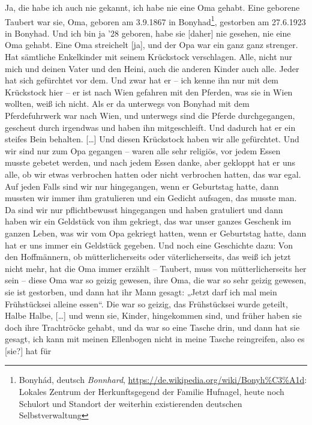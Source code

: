 \documentclass[ngerman,]{article}
\providecommand{\tightlist}{%
  \setlength{\itemsep}{0pt}\setlength{\parskip}{0pt}}
\begin{document}
\begin{multicols}{3}
\begin{description}
\tightlist
\item[Käthe]
Ja, die habe ich auch nie gekannt, ich habe nie eine Oma gehabt. Eine
geborene Taubert war sie, Oma, geboren am 3.9.1867 in Bonyhad\footnote{Bonyhád,
  deutsch \emph{Bonnhard},
  \url{https://de.wikipedia.org/wiki/Bonyh\%C3\%A1d}: Lokales Zentrum
  der Herkunftsgegend der Familie Hufnagel, heute noch Schulort und
  Standort der weiterhin existierenden deutschen Selbstverwaltung},
gestorben am 27.6.1923 in Bonyhad. Und ich bin ja '28 geboren, habe sie
{[}daher{]} nie gesehen, nie eine Oma gehabt. Eine Oma streichelt
{[}ja{]}, und der Opa war ein ganz ganz strenger. Hat sämtliche
Enkelkinder mit seinem Krückstock verschlagen. Alle, nicht nur mich und
deinen Vater und den Heini, auch die anderen Kinder auch alle. Jeder hat
sich gefürchtet vor dem. Und zwar hat er – ich kenne ihn nur mit dem
Krückstock hier – er ist nach Wien gefahren mit den Pferden, was sie in
Wien wollten, weiß ich nicht. Als er da unterwegs von Bonyhad mit dem
Pferdefuhrwerk war nach Wien, und unterwegs sind die Pferde
durchgegangen, gescheut durch irgendwas und haben ihn mitgeschleift. Und
dadurch hat er ein steifes Bein behalten. {[}\ldots{}{]} Und diesen
Krückstock haben wir alle gefürchtet. Und wir sind nur zum Opa gegangen
– waren alle sehr religiös, vor jedem Essen musste gebetet werden, und
nach jedem Essen danke, aber gekloppt hat er uns alle, ob wir etwas
verbrochen hatten oder nicht verbrochen hatten, das war egal. Auf jeden
Falls sind wir nur hingegangen, wenn er Geburtstag hatte, dann mussten
wir immer ihm gratulieren und ein Gedicht aufsagen, das musste man. Da
sind wir nur pflichtbewusst hingegangen und haben gratuliert und dann
haben wir ein Geldstück von ihm gekriegt, das war unser ganzes Geschenk
im ganzen Leben, was wir vom Opa gekriegt hatten, wenn er Geburtstag
hatte, dann hat er uns immer ein Geldstück gegeben. Und noch eine
Geschichte dazu: Von den Hoffmännern, ob mütterlicherseits oder
väterlicherseits, das weiß ich jetzt nicht mehr, hat die Oma immer
erzählt – Taubert, muss von mütterlicherseits her sein – diese Oma war
so geizig gewesen, ihre Oma, die war so sehr geizig gewesen, sie ist
gestorben, und dann hat ihr Mann gesagt: „Jetzt darf ich mal mein
Frühstücksei alleine essen“. Die war so geizig, das Frühstücksei wurde
geteilt, Halbe Halbe, {[}\ldots{}{]} und wenn sie, Kinder, hingekommen
sind, und früher haben sie doch ihre Trachtröcke gehabt, und da war so
eine Tasche drin, und dann hat sie gesagt, ich kann mit meinen
Ellenbogen nicht in meine Tasche reingreifen, also es {[}sie?{]} hat für

\end{description}
\end{multicols}
\end{document}
